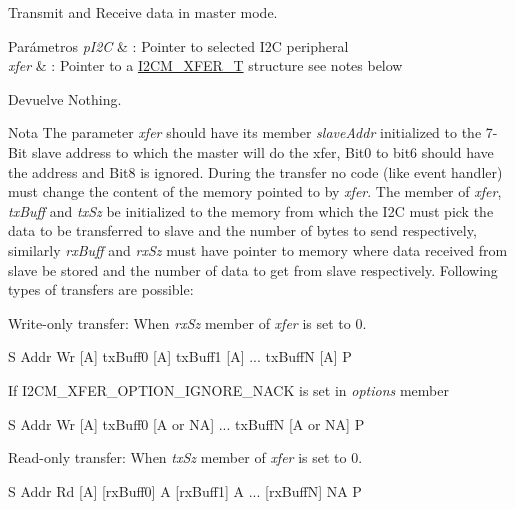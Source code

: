 Transmit and Receive data in master mode. 


\begin{DoxyParams}{Parámetros}
{\em p\+I2C} & \+: Pointer to selected I2C peripheral \\
\hline
{\em xfer} & \+: Pointer to a \hyperlink{struct_i2_c_m___x_f_e_r___t}{I2\+C\+M\+\_\+\+X\+F\+E\+R\+\_\+T} structure see notes below \\
\hline
\end{DoxyParams}
\begin{DoxyReturn}{Devuelve}
Nothing. 
\end{DoxyReturn}
\begin{DoxyNote}{Nota}
The parameter {\itshape xfer} should have its member {\itshape slave\+Addr} initialized to the 7-\/\+Bit slave address to which the master will do the xfer, Bit0 to bit6 should have the address and Bit8 is ignored. During the transfer no code (like event handler) must change the content of the memory pointed to by {\itshape xfer}. The member of {\itshape xfer}, {\itshape tx\+Buff} and {\itshape tx\+Sz} be initialized to the memory from which the I2C must pick the data to be transferred to slave and the number of bytes to send respectively, similarly {\itshape rx\+Buff} and {\itshape rx\+Sz} must have pointer to memory where data received from slave be stored and the number of data to get from slave respectively. Following types of transfers are possible\+:
\begin{DoxyItemize}
\item Write-\/only transfer\+: When {\itshape rx\+Sz} member of {\itshape xfer} is set to 0. \begin{DoxyVerb}   S Addr Wr [A] txBuff0 [A] txBuff1 [A] ... txBuffN [A] P
\end{DoxyVerb}

\begin{DoxyItemize}
\item If I2\+C\+M\+\_\+\+X\+F\+E\+R\+\_\+\+O\+P\+T\+I\+O\+N\+\_\+\+I\+G\+N\+O\+R\+E\+\_\+\+N\+A\+CK is set in {\itshape options} member

S Addr Wr \mbox{[}A\mbox{]} tx\+Buff0 \mbox{[}A or NA\mbox{]} ... tx\+BuffN \mbox{[}A or NA\mbox{]} P
\end{DoxyItemize}
\item Read-\/only transfer\+: When {\itshape tx\+Sz} member of {\itshape xfer} is set to 0. \begin{DoxyVerb}   S Addr Rd [A] [rxBuff0] A [rxBuff1] A ... [rxBuffN] NA P
\end{DoxyVerb}


\end{DoxyItemize}
\end{DoxyNote}
